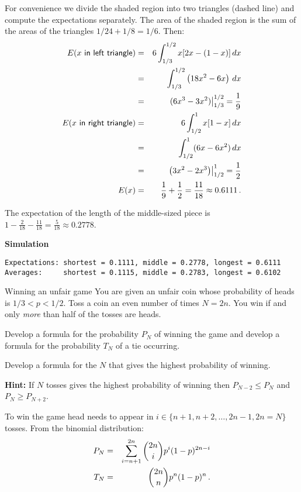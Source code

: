 For convenience we divide the shaded region into two triangles (dashed line) and compute the expectations separately. The area of the shaded region is the sum of the areas of the triangles $1/24+1/8=1/6$. Then:
\begin{eqnarray*}
E(x \textsf{\ in left triangle})&=& 6\int_{1/3}^{1/2} x [2x-(1-x)]\,dx  \\
&=&\int_{1/3}^{1/2} \left(18x^2-6x\right)\,dx\\
&=&\left. (6x^3-3x^2)\right|_{1/3}^{1/2}=\displaystyle\frac{1}{9}\\
E(x \textsf{\ in right triangle})&=& 6\int_{1/2}^{1} x [1-x]\,dx\\
&=&\int_{1/2}^{1} (6x-6x^2)\,dx\\
&=&\left. \left(3x^2-2x^3\right)\right|_{1/2}^{1}= \displaystyle\frac{1}{2}\\
E(x)&=& \displaystyle\frac{1}{9}+\displaystyle\frac{1}{2} = \displaystyle\frac{11}{18}\approx 0.6111\,.
\end{eqnarray*}

The expectation of the length of the middle-sized piece is $1-\frac{2}{18}-\frac{11}{18}=\frac{5}{18}\approx 0.2778$.

\textbf{Simulation}
\begin{verbatim}
Expectations: shortest = 0.1111, middle = 0.2778, longest = 0.6111
Averages:     shortest = 0.1115, middle = 0.2783, longest = 0.6102
\end{verbatim}


\begin{prob}{Winning an unfair game}
You are given an unfair coin whose probability of heads is $1/3 < p < 1/2$. Toss a coin an even number of times $N=2n$. You win if and only \emph{more} than half of the tosses are heads.

 Develop a formula for the probability $P_N$ of winning the game and develop a formula for the probability $T_N$ of a tie occurring.

 Develop a formula for the $N$ that gives the highest probability of winning.

\textbf{Hint:} If $N$ tosses gives the highest probability of winning then $P_{N-2} \leq P_N$ and $P_N\geq P_{N+2}$.
\end{prob}

\solution{}

 To win the game head needs to appear in $i\in\{n+1, n+2, \ldots, 2n-1, 2n=N\}$ tosses. From the binomial distribution:
\begin{eqnarray*}
P_N &=& \sum_{i=n+1}^{2n} \displaystyle{2n \choose i} p^i (1-p)^{2n-i}\\
T_N &=& \displaystyle{2n \choose n} p^n (1-p)^{n}\,.
\end{eqnarray*}


